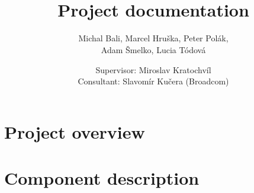 \documentclass[10pt,a4paper]{report}
\title{\textcool{\bf High Level Assembler Plugin} \\ Project documentation}
\author{Michal Bali, Marcel Hruška, Peter Polák,\\ Adam Šmelko, Lucia Tódová}
\date{Supervisor: Miroslav Kratochvíl \\ \vspace{5mm} Consultant: Slavomír Kučera (Broadcom)}
\begin{document}
\maketitle


\tableofcontents



\part{Project overview}



\part{Component description}














 

\end{document}
